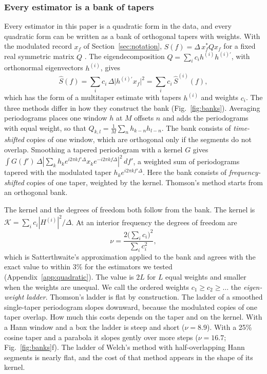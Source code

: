 \documentclass[10pt,twocolumn]{article}
\newcommand{\dd}{\,d}
\begin{document}
\subsubsection{Every estimator is a bank of tapers}
\label{sec:banks}
Every estimator in this paper is a quadratic form in the data, and every quadratic form can be written as a bank of orthogonal tapers with weights. With the modulated record $x_f$ of Section~\ref{sec:notation}, $\hat S(f)=\Delta\,x_f^{*}Qx_f$ for a fixed real symmetric matrix $Q$ \cite{percival1993,riedel1995}. The eigendecomposition $Q=\sum_ic_ih^{(i)}h^{(i)\prime}$, with orthonormal eigenvectors $h^{(i)}$, gives
\begin{equation}
\hat S(f)=\sum_i c_i\,\Delta\bigl|h^{(i)\prime}x_f\bigr|^2=\sum_ic_i\,\hat S^{(i)}(f),
\label{eq:bank}
\end{equation}
which has the form of a multitaper estimate with tapers $h^{(i)}$ and weights $c_i$. The three methods differ in how they construct the bank (Fig.~\ref{fig:banks}). Averaging periodograms places one window $h$ at $M$ offsets $n$ and adds the periodograms with equal weight, so that $Q_{k,l}=\frac1M\sum_nh_{k-n}h_{l-n}$. The bank consists of \emph{time-shifted} copies of one window, which are orthogonal only if the segments do not overlap. Smoothing a tapered periodogram with a kernel $G$ gives $\int G(f')\,\Delta|\sum_kh_ke^{i2\pi kf'\Delta}x_ke^{-i2\pi kf\Delta}|^2\dd f'$, a weighted sum of periodograms tapered with the modulated taper $h_ke^{i2\pi kf'\Delta}$. Here the bank consists of \emph{frequency-shifted} copies of one taper, weighted by the kernel. Thomson's method starts from an orthogonal bank.

The kernel and the degrees of freedom both follow from the bank. The kernel is $\mathcal{K}=\sum_ic_i|H^{(i)}|^2/\Delta$. At an interior frequency the degrees of freedom are
\begin{equation}
\nu=\frac{2\bigl(\sum_ic_i\bigr)^2}{\sum_ic_i^2},
\label{eq:ladder}
\end{equation}
which is Satterthwaite's approximation \cite{satterthwaite1946} applied to the bank and agrees with the exact value to within 3\% for the estimators we tested (Appendix~\ref{app:quadratic}). The value is $2L$ for $L$ equal weights and smaller when the weights are unequal. We call the ordered weights $c_1\ge c_2\ge\dots$ the \emph{eigen-weight ladder}. Thomson's ladder is flat by construction. The ladder of a smoothed single-taper periodogram slopes downward, because the modulated copies of one taper overlap. How much this costs depends on the taper and on the kernel. With a Hann window and a box the ladder is steep and short ($\nu=8.9$). With a 25\% cosine taper and a parabola it slopes gently over more steps ($\nu=16.7$; Fig.~\ref{fig:banks}f). The ladder of Welch's method with half-overlapping Hann segments is nearly flat, and the cost of that method appears in the shape of its kernel.
\end{document}
